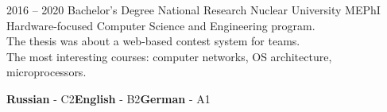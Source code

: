\documentclass[10pt]{template}
\begin{document}


\begin{entrylist}
	\entry
	{2016 -- 2020}
	{Bachelor's Degree}
	{National Research Nuclear University MEPhI}
	{Hardware-focused Computer Science and Engineering program.\\
	The thesis was about a web-based contest system for teams.\\ 
	The most interesting courses: computer networks, OS architecture, microprocessors.}
\end{entrylist}


\begin{minipage}[t]{0.6\textwidth}
	\vspace{-\baselineskip}
	
		
	\textbf{Russian} - C2\slashsep\textbf{English} - B2\slashsep\textbf{German} - A1
\end{minipage}


\end{document}
